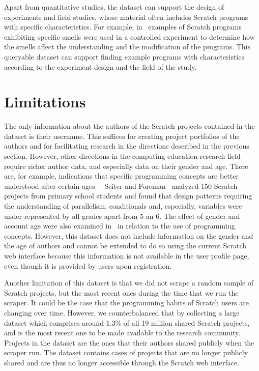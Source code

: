 \documentclass[10pt, conference]{IEEEtran}
\begin{document}
Apart from quantitative studies, the dataset can support the design of experiments and field studies, whose material often includes Scratch programs with specific characteristics.
For example, in~\cite{hermans_2016} examples of Scratch programs exhibiting specific smells were used in a controlled experiment to determine how the smells affect the understanding and the modification of the programs.
This queryable dataset can support finding example programs with characteristics according to the experiment design and the field of the study.

\section{Limitations}
The only information about the authors of the Scratch projects contained in the dataset is their username.
This suffices for creating project portfolios of the authors and for facilitating research in the directions described in the previous section.
However, other directions in the computing education research field require richer author data, and especially data on their gender and age.
There are, for example, indications that specific programming concepts are better understood after certain ages ---Seiter and Foreman~\cite{Seiter_2013} analyzed 150 Scratch projects from primary school students and found that design patterns requiring the understanding of parallelism, conditionals and, especially, variables were under-represented by all grades apart from 5 an 6.
The effect of gender and account age were also examined in~\cite{fields_2014} in relation to the use of programming concepts.
However, this dataset does not include information on the gender and the age of authors and cannot be extended to do so using the current Scratch web interface because this information is not available in the user profile page\footnotemark[\ref{fn-authorpage}], even though it is provided by users upon registration.

Another limitation of this dataset is that we did not scrape a random sample of Scratch projects, but the most recent ones during the time that we run the scraper.
It could be the case that the programming habits of Scratch users are changing over time.
However, we counterbalanced that by collecting a large dataset which comprises around 1.3\% of all 19 million shared Scratch projects, and is the most recent one to be made available to the research community.
Projects in the dataset are the ones that their authors shared publicly when the scraper run. The dataset contains cases of projects that are no longer publicly shared and are thus no longer accessible through the Scratch web interface.
\end{document}
